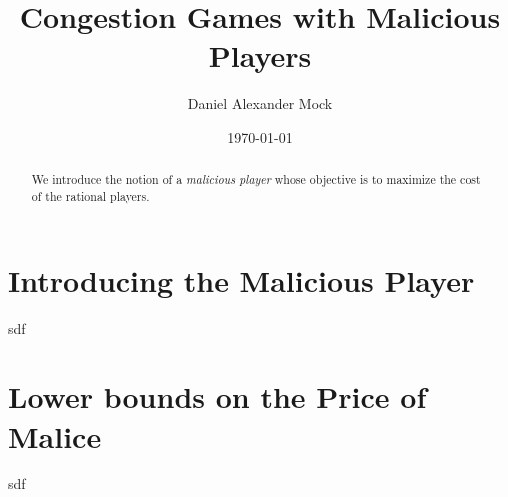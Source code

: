 \documentclass[a4paper]{tufte-handout}
\title{Congestion Games with Malicious Players}
\author{Daniel Alexander Mock}
\date{\today}
\begin{document}
	\maketitle
	
	\begin{abstract}
		We introduce the notion of a \emph{malicious player} whose objective is to maximize the cost of the rational players.
	\end{abstract}





\section{Introducing the Malicious Player}
sdf
\section{Lower bounds on the Price of Malice}
sdf


\end{document}
